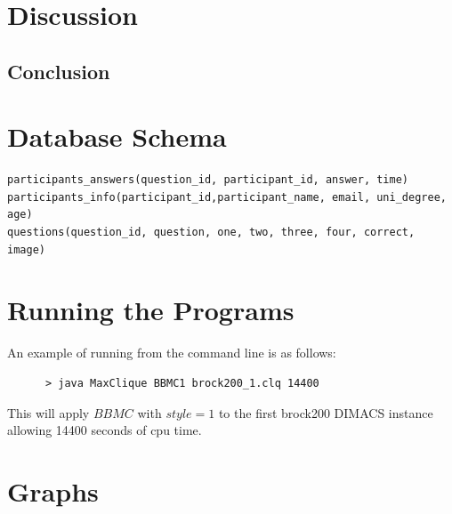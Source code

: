 \documentclass{l4proj}
\begin{document}
\chapter{Discussion}

\section{Conclusion}


\begin{appendices}

\chapter{Database Schema}

\begin{verbatim}
participants_answers(question_id, participant_id, answer, time)
participants_info(participant_id,participant_name, email, uni_degree, age)
questions(question_id, question, one, two, three, four, correct, image)
\end{verbatim}


\chapter{Running the Programs}
An example of running from the command line is as follows:
\begin{verbatim}
      > java MaxClique BBMC1 brock200_1.clq 14400
\end{verbatim}
This will apply $BBMC$ with $style = 1$ to the first brock200 DIMACS instance allowing 14400 seconds of cpu time.

\chapter{Graphs}


\end{appendices}
\end{document}
